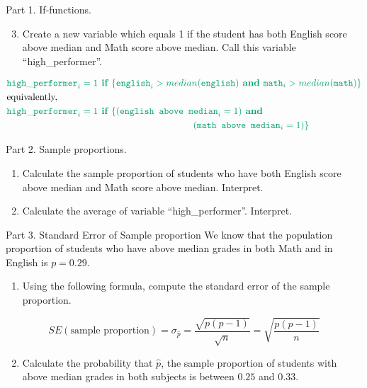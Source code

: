\documentclass[
  10pt,
  ignorenonframetext,
]{beamer}
\providecommand{\tightlist}{%
  \setlength{\itemsep}{0pt}\setlength{\parskip}{0pt}}
\begin{document}
\begin{frame}{Part 1. If-functions.}
\protect\hypertarget{part-1.-if-functions.-2}{}
\begin{enumerate}
\setcounter{enumi}{2}
\tightlist
\item
  Create a new variable which equals 1 if the student has both English
  score above median and Math score above median. Call this variable
  ``high\_performer''.
\end{enumerate}

\small

\[
\begin{aligned}
&\color{green}{\texttt{high}\_\texttt{performer}_i = 1 \textbf{ if } \{ \texttt{english}_i > median(\texttt{english}) \textbf{ and } \texttt{math}_i > median(\texttt{math}) \} }\\
&\text{equivalently,}\\
&\color{green}{\texttt{high}\_\texttt{performer}_i = 1 \textbf{ if } \{ (\texttt{english above median}_i = 1) \textbf{ and }}\\ 
&\hspace{7cm}\color{green}{(\texttt{math above median}_i = 1) \} }
\end{aligned}
\]
\end{frame}

\begin{frame}{Part 2. Sample proportions.}
\protect\hypertarget{part-2.-sample-proportions.}{}
\begin{enumerate}
\tightlist
\item
  Calculate the sample proportion of students who have both English
  score above median and Math score above median. Interpret.
\item
  Calculate the average of variable ``high\_performer''. Interpret.
\end{enumerate}
\end{frame}

\begin{frame}{Part 3. Standard Error of Sample proportion}
\protect\hypertarget{part-3.-standard-error-of-sample-proportion}{}
We know that the population proportion of students who have above median
grades in both Math and in English is \(p = 0.29\).

\begin{enumerate}
\tightlist
\item
  Using the following formula, compute the standard error of the sample
  proportion.
\end{enumerate}

\[
SE(\text{sample proportion}) = \sigma_{\hat{p}} = \frac{\sqrt{p(p-1)}}{\sqrt{n}} = \sqrt{\frac{p(p-1)}{n}}
\]

\begin{enumerate}
\setcounter{enumi}{1}
\tightlist
\item
  Calculate the probability that \(\hat{p}\), the sample proportion of
  students with above median grades in both subjects is between \(0.25\)
  and \(0.33\).
\end{enumerate}
\end{frame}
\end{document}
